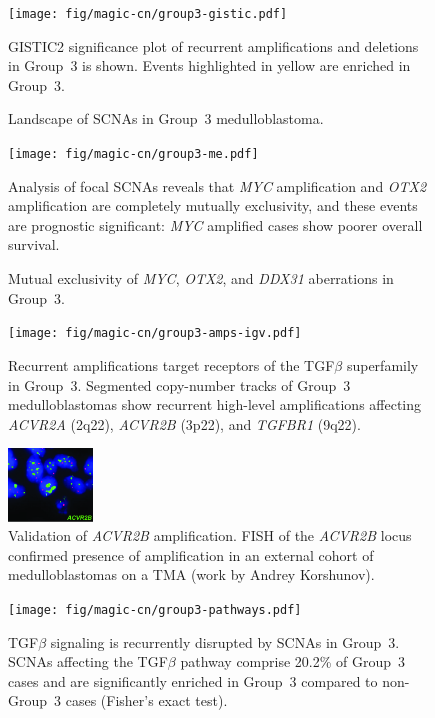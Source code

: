 \documentclass[11pt,letterpaper]{article}
\theoremstyle{definition}
\begin{document}
\clearpage

\begin{figure}[h]
	\begin{center}
		\texttt{[image: fig/magic-cn/group3-gistic.pdf]}
	\end{center}
	\caption{Landscape of SCNAs in Group~3 medulloblastoma.}
	GISTIC2 significance plot of recurrent amplifications and deletions in Group~3 is shown. Events highlighted in yellow are enriched in Group~3.
	\label{fig:group3-gistic}
\end{figure}

\clearpage

\begin{figure}[h]
	\begin{center}
		\texttt{[image: fig/magic-cn/group3-me.pdf]}
	\end{center}
	\caption{Mutual exclusivity of \emph{MYC}, \emph{OTX2}, and \emph{DDX31} aberrations in Group~3.}
	Analysis of focal SCNAs reveals that \emph{MYC} amplification and \emph{OTX2} amplification are completely mutually exclusivity, and these events are prognostic significant: \emph{MYC} amplified cases show poorer overall survival.
	\label{fig:group3-me}
\end{figure}

\begin{figure}
	\centering
	\texttt{[image: fig/magic-cn/group3-amps-igv.pdf]}
	\caption{Recurrent amplifications target receptors of the TGF$\beta$ superfamily in Group~3.
		Segmented copy-number tracks of Group~3 medulloblastomas show recurrent high-level amplifications affecting \emph{ACVR2A} (2q22), \emph{ACVR2B} (3p22), and \emph{TGFBR1} (9q22).}
	\label{fig:group3-amps-igv}
\end{figure}

\begin{figure}
	\centering
	\includegraphics[width=0.2\textwidth]{fig/magic-cn/acvr2b-fish.jpg}
	\caption{Validation of \emph{ACVR2B} amplification.
	FISH of the \emph{ACVR2B} locus confirmed presence of amplification in an external cohort of medulloblastomas on a TMA (work by Andrey Korshunov).}
	\label{fig:acvr2b-fish}
\end{figure}

\begin{figure}
	\centering
	\texttt{[image: fig/magic-cn/group3-pathways.pdf]}
	\caption{TGF$\beta$ signaling is recurrently disrupted by SCNAs in Group~3.
SCNAs affecting the TGF$\beta$ pathway comprise 20.2\% of Group~3 cases and are significantly enriched in Group~3 compared to non-Group~3 cases (Fisher’s exact test).}
	\label{fig:group3-pathways}
\end{figure}
\end{document}
